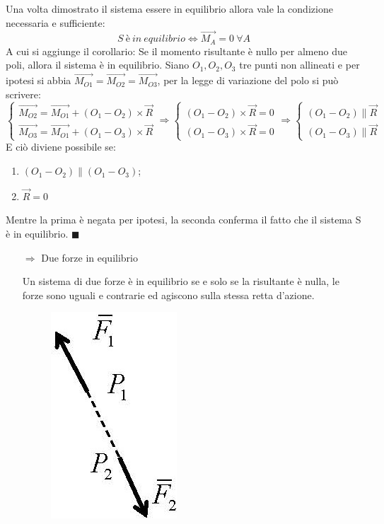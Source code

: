 \documentclass{article}
\begin{document}
\begin{adjustwidth}{2in}{}
\begin{enumerate}
Una volta dimostrato il sistema essere in equilibrio allora vale la condizione necessaria e sufficiente: 
\[ 
S ~ è ~ in ~ equilibrio \Leftrightarrow \vec{M_{A}} = 0 ~ \forall A
\]
A cui si aggiunge il corollario: Se il momento risultante è nullo per almeno due poli, allora il sistema è in equilibrio.
Siano $ O_{1}, O_{2}, O_{3}$ tre punti non allineati e per ipotesi si abbia $\vec{M_{O1}} = \vec{M_{O2}} = \vec{M_{O3}}$, per la legge di variazione del polo si può scrivere:
\[ 
\begin{cases}
	\vec{M_{O2}} = \vec{M_{O1}} + (O_{1} - O_{2})\times \vec{R} \\
	\vec{M_{O3}} = \vec{M_{O1}} + (O_{1} - O_{3})\times \vec{R}
	\end{cases} \Rightarrow \begin{cases}
	(O_{1} - O_{2})\times \vec{R} = 0 \\
	(O_{1} - O_{3})\times \vec{R} = 0
	\end{cases}  \Rightarrow \begin{cases}
		(O_{1} - O_{2}) \parallel \vec{R}  \\
	(O_{1} - O_{3})\parallel \vec{R} 
	\end{cases}
\]
E ciò diviene possibile se: 
\begin{enumerate}
	\item $(O_{1} - O_{2}) \parallel (O_{1} - O_{3})$; 
	\item $\vec{R} = 0$
\end{enumerate}
Mentre la prima è negata per ipotesi, la seconda conferma il fatto che il sistema S è in equilibrio. $\blacksquare$
\newpage
\begin{itemize}
\item[$\Rightarrow$] Due forze in equilibrio

Un sistema di due forze è in equilibrio se e solo se la risultante è nulla, le forze sono uguali e contrarie ed agiscono sulla stessa retta d'azione. \newline
\begin{figure}[H]
	\centering
	\includegraphics[width=0.2\linewidth]{immagini/1.PARTE1_Pagina_14}
\end{figure}


\end{itemize}
\end{enumerate}
\end{adjustwidth}
\end{document}
